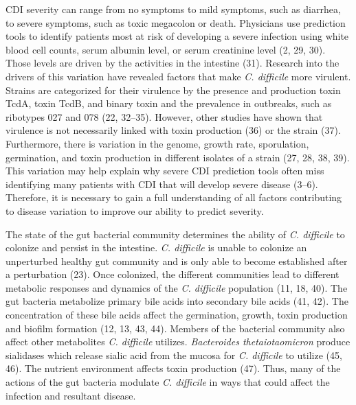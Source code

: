 \documentclass[
  12pt,
]{article}
\begin{document}
CDI severity can range from no symptoms to mild symptoms, such as
diarrhea, to severe symptoms, such as toxic megacolon or death.
Physicians use prediction tools to identify patients most at risk of
developing a severe infection using white blood cell counts, serum
albumin level, or serum creatinine level (2, 29, 30). Those levels are
driven by the activities in the intestine (31). Research into the
drivers of this variation have revealed factors that make \emph{C.
difficile} more virulent. Strains are categorized for their virulence by
the presence and production toxin TcdA, toxin TcdB, and binary toxin and
the prevalence in outbreaks, such as ribotypes 027 and 078 (22, 32--35).
However, other studies have shown that virulence is not necessarily
linked with toxin production (36) or the strain (37). Furthermore, there
is variation in the genome, growth rate, sporulation, germination, and
toxin production in different isolates of a strain (27, 28, 38, 39).
This variation may help explain why severe CDI prediction tools often
miss identifying many patients with CDI that will develop severe disease
(3--6). Therefore, it is necessary to gain a full understanding of all
factors contributing to disease variation to improve our ability to
predict severity.

The state of the gut bacterial community determines the ability of
\emph{C. difficile} to colonize and persist in the intestine. \emph{C.
difficile} is unable to colonize an unperturbed healthy gut community
and is only able to become established after a perturbation (23). Once
colonized, the different communities lead to different metabolic
responses and dynamics of the \emph{C. difficile} population (11, 18,
40). The gut bacteria metabolize primary bile acids into secondary bile
acids (41, 42). The concentration of these bile acids affect the
germination, growth, toxin production and biofilm formation (12, 13, 43,
44). Members of the bacterial community also affect other metabolites
\emph{C. difficile} utilizes. \emph{Bacteroides thetaiotaomicron}
produce sialidases which release sialic acid from the mucosa for
\emph{C. difficile} to utilize (45, 46). The nutrient environment
affects toxin production (47). Thus, many of the actions of the gut
bacteria modulate \emph{C. difficile} in ways that could affect the
infection and resultant disease.
\end{document}

